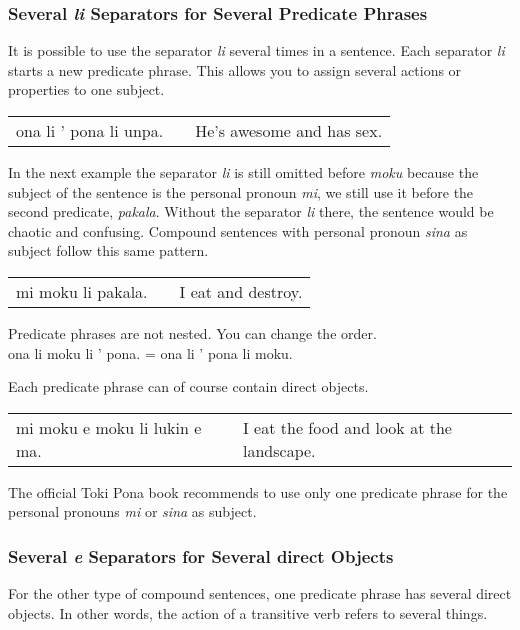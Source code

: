 \subsubsection*{Several \textit{li} Separators for Several Predicate Phrases}
%

It is possible to use the separator \textit{li} several times in a sentence. 
Each separator \textit{li} starts a new predicate phrase. 
This allows you to assign several actions or properties to one subject. 

\begin{supertabular}{p{5,5cm}|ll}
ona li ' pona li unpa. && He's awesome and has sex. \\
\end{supertabular} 

In the next example the separator \textit{li} is still omitted before \textit{moku} because the subject of the sentence is the personal pronoun \textit{mi}, we still use it before the second predicate, \textit{pakala}. 
Without the separator \textit{li} there, the sentence would be chaotic and confusing. 
Compound sentences with personal pronoun \textit{sina} as subject follow this same pattern. 

\begin{supertabular}{p{5,5cm}|ll}
mi moku li pakala. && I eat and destroy. \\
\end{supertabular} 

Predicate phrases are not nested. You can change the order. \\
ona li moku li ' pona. = ona li ' pona li moku. 

Each predicate phrase can of course contain direct objects. 

\begin{supertabular}{p{5,5cm}|ll}
mi moku e moku li lukin e ma. && I eat the food and look at the landscape. \\
\end{supertabular} 

The official Toki Pona book recommends to use only one predicate phrase for the personal pronouns \textit{mi} or \textit{sina} as subject. 
%
\label{'multiple_e'}
\subsubsection*{Several \textit{e} Separators for Several direct Objects}
%
For the other type of compound sentences, one predicate phrase has several direct objects. 
In other words, the action of a transitive verb refers to several things. 

